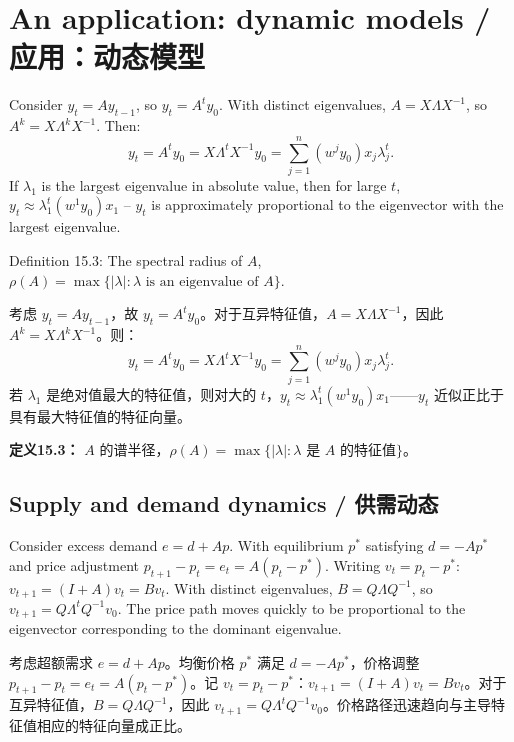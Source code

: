 \section{An application: dynamic models / 应用：动态模型}

\begin{original}
Consider $y_t = A y_{t-1}$, so $y_t = A^t y_0$. With distinct eigenvalues, $A = X\Lambda X^{-1}$, so $A^k = X\Lambda^k X^{-1}$. Then:
\[
y_t = A^t y_0 = X\Lambda^t X^{-1} y_0 = \sum_{j=1}^n (w^j y_0) x_j \lambda_j^t. \tag{15.2}
\]
If $\lambda_1$ is the largest eigenvalue in absolute value, then for large $t$, $y_t \approx \lambda_1^t (w^1 y_0) x_1$ -- $y_t$ is approximately proportional to the eigenvector with the largest eigenvalue.

Definition 15.3: The spectral radius of $A$, $\rho(A) = \max\{|\lambda| : \lambda \text{ is an eigenvalue of } A\}$.
\end{original}
\begin{translation}
考虑 $y_t = A y_{t-1}$，故 $y_t = A^t y_0$。对于互异特征值，$A = X\Lambda X^{-1}$，因此 $A^k = X\Lambda^k X^{-1}$。则：
\[
y_t = A^t y_0 = X\Lambda^t X^{-1} y_0 = \sum_{j=1}^n (w^j y_0) x_j \lambda_j^t. \tag{15.2}
\]
若 $\lambda_1$ 是绝对值最大的特征值，则对大的 $t$，$y_t \approx \lambda_1^t (w^1 y_0) x_1$——$y_t$ 近似正比于具有最大特征值的特征向量。

\textbf{定义15.3：} $A$ 的谱半径，$\rho(A) = \max\{|\lambda| : \lambda \text{ 是 } A \text{ 的特征值}\}$。
\end{translation}

\subsection{Supply and demand dynamics / 供需动态}

\begin{original}
Consider excess demand $e = d + Ap$. With equilibrium $p^*$ satisfying $d = -Ap^*$ and price adjustment $p_{t+1} - p_t = e_t = A(p_t - p^*)$. Writing $v_t = p_t - p^*$: $v_{t+1} = (I + A)v_t = Bv_t$. With distinct eigenvalues, $B = Q\Lambda Q^{-1}$, so $v_{t+1} = Q\Lambda^t Q^{-1} v_0$. The price path moves quickly to be proportional to the eigenvector corresponding to the dominant eigenvalue.
\end{original}
\begin{translation}
考虑超额需求 $e = d + Ap$。均衡价格 $p^*$ 满足 $d = -Ap^*$，价格调整 $p_{t+1} - p_t = e_t = A(p_t - p^*)$。记 $v_t = p_t - p^*$：$v_{t+1} = (I + A)v_t = Bv_t$。对于互异特征值，$B = Q\Lambda Q^{-1}$，因此 $v_{t+1} = Q\Lambda^t Q^{-1} v_0$。价格路径迅速趋向与主导特征值相应的特征向量成正比。
\end{translation}

